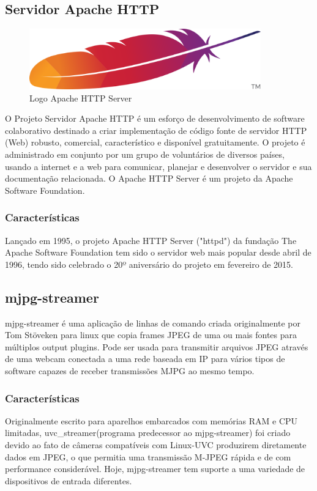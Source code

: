 		\subsection{Servidor Apache HTTP}\label{subsec-apache}
		
					 \begin{figure}[h!]
			\caption{\label{fig_apachelogo}  Logo Apache HTTP Server}
			\begin{center}
				\includegraphics[width=100mm]{Apache_HTTP_server_logo_(2016).png}	
			\end{center}
		\end{figure}
		O  Projeto Servidor Apache HTTP é um esforço de desenvolvimento de software colaborativo destinado a criar implementação de código fonte de servidor HTTP (Web) robusto, comercial, característico e disponível gratuitamente. O projeto é administrado em conjunto por um grupo de voluntários de diversos países, usando a internet e a web para comunicar, planejar e desenvolver o servidor e sua documentação relacionada.
		O Apache HTTP Server é um projeto da Apache Software Foundation.

	\subsubsection{Características}\label{subsubsec-caracteristicasapache}

	Lançado em 1995, o projeto Apache HTTP Server ("httpd") da fundação The Apache Software Foundation tem sido o servidor web mais popular desde abril de 1996, tendo sido celebrado o 20º aniversário do projeto em fevereiro de 2015.\cite{apache}
	
		\subsection{mjpg-streamer}\label{subsec-mjpg-streamer}	
		
		
		
	mjpg-streamer é uma aplicação de linhas de comando criada originalmente por Tom Stöveken para linux que copia frames JPEG de uma ou mais fontes para múltiplos output plugins. Pode ser usada para transmitir arquivos JPEG  através de uma webcam conectada a uma rede baseada em IP para vários tipos de software capazes de receber transmissões MJPG ao mesmo tempo.
	\subsubsection{Características}\label{subsubsec-histmjpg}
	Originalmente escrito para aparelhos embarcados com memórias RAM e CPU limitadas, uvc\_streamer(programa predecessor ao mjpg-streamer)  foi criado devido ao fato de câmeras compatíveis com Linux-UVC produzirem diretamente dados em JPEG, o que  permitia uma transmissão M-JPEG rápida e de com performance considerável.
	 Hoje, mjpg-streamer tem suporte a uma variedade de dispositivos de entrada diferentes.\cite{mjpg}
